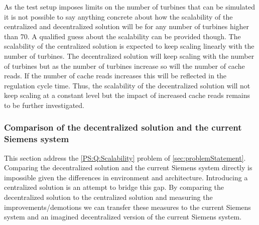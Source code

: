 As the test setup imposes limits on the number of turbines that can be simulated it is not possible to say anything concrete about how the scalability of the centralized and decentralized solution will be for any number of turbines higher than 70.
A qualified guess about the scalability can be provided though. The scalability of the centralized solution is expected to keep scaling linearly with the number of turbines. The decentralized solution will keep scaling with the number of turbines but as the number of turbines increase so will the number of cache reads. If the number of cache reads increases this will be reflected in the regulation cycle time. Thus, the scalability of the decentralized solution will not keep scaling at a constant level but the impact of increased cache reads remains to be further investigated.



\FloatBarrier


\subsubsection{Comparison of the decentralized solution and the current Siemens system}
This section address the \ref{PS:Q:Scalability} problem of \cref{sec:problemStatement}.
Comparing the decentralized solution and the current Siemens system directly is impossible given the differences in environment and architecture. Introducing a centralized solution is an attempt to bridge this gap. By comparing the decentralized solution to the centralized solution and measuring the improvements/demotions we can transfer these measures to the current Siemens system and an imagined decentralized version of the current Siemens system.

